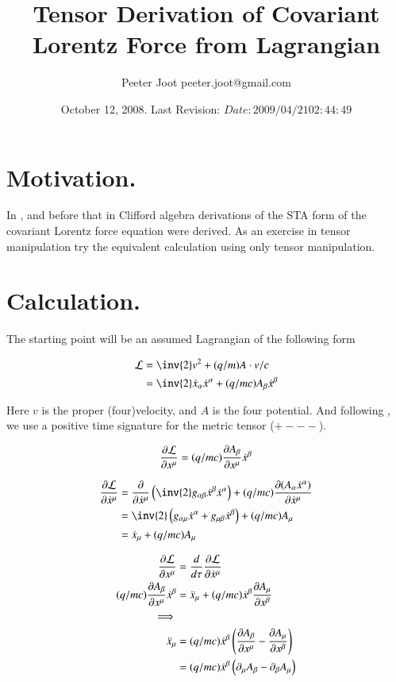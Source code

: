 \documentclass{article}
\title{Tensor Derivation of Covariant Lorentz Force from Lagrangian}
\author{Peeter Joot \quad peeter.joot@gmail.com}
\date{ October 12, 2008.  Last Revision: $Date: 2009/04/21 02:44:49 $ }
\begin{document}
\maketitle{}
\tableofcontents
\section{ Motivation. }

In \cite{PJSrLorentzForce}, and before that in \cite{PJSrLagrangian} Clifford
algebra derivations of the STA form of the covariant Lorentz force equation
were derived.  As an exercise in tensor manipulation try the equivalent
calculation using only tensor manipulation.

\section{ Calculation. }

The starting point will be an assumed Lagrangian of the following form

\begin{align}\label{eqn:lagrangian}
\LL &= \inv{2} v^2 + (q/m) A \cdot v/c \\
&= \inv{2} \xdot_\alpha \xdot^\alpha + (q/mc) A_\beta \xdot^\beta
\end{align}

Here $v$ is the proper (four)velocity, and $A$ is the four potential.
And following \cite{doran2003gap}, we use a positive time signature for the metric tensor ($+---$).

\begin{align*}
\PD{x^\mu}{\LL} = (q/mc) \PD{x^\mu}{A_\beta} \xdot^\beta
\end{align*}

\begin{align*}
\PD{\xdot^\mu}{\LL}
&= \PD{\xdot^\mu}{} \left( \inv{2} g_{\alpha\beta} \xdot^\beta \xdot^\alpha \right) + (q/mc) \PD{\xdot^\mu}{(A_\alpha \xdot^\alpha)} \\
&= \inv{2} \left( g_{\alpha\mu} \xdot^\alpha +g_{\mu\beta} \xdot^\beta \right) + (q/mc) A_\mu \\
&= \xdot_\mu + (q/mc) A_\mu \\
\end{align*}

\begin{align*}
\PD{x^\mu}{\LL} &= \frac{d}{d\tau} \PD{\xdot^\mu}{\LL} \\
(q/mc) \PD{x^\mu}{A_\beta} \xdot^\beta &= \xddot_\mu + (q/mc) \xdot^\beta \PD{x^\beta}{A_\mu} \\
\implies \\
\xddot_\mu
&= (q/mc) \xdot^\beta \left( \PD{x^\mu}{A_\beta} - \PD{x^\beta}{A_\mu} \right) \\
&= (q/mc) \xdot^\beta \left( \partial_\mu {A_\beta} - \partial_{\beta}{A_\mu} \right) \\
\end{align*}
\end{document}
